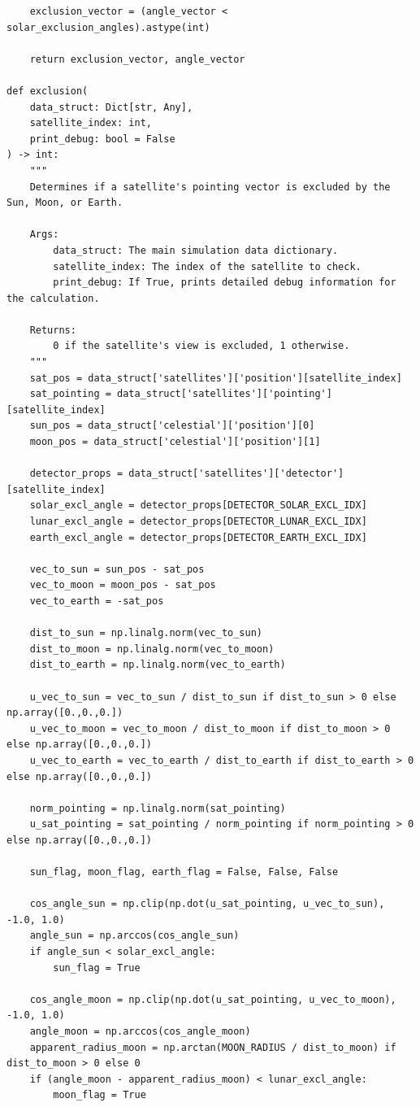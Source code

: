 \documentclass[11pt]{article}
\begin{document}
\begin{Verbatim}
    exclusion_vector = (angle_vector < solar_exclusion_angles).astype(int)

    return exclusion_vector, angle_vector

def exclusion(
    data_struct: Dict[str, Any],
    satellite_index: int,
    print_debug: bool = False
) -> int:
    """
    Determines if a satellite's pointing vector is excluded by the Sun, Moon, or Earth.

    Args:
        data_struct: The main simulation data dictionary.
        satellite_index: The index of the satellite to check.
        print_debug: If True, prints detailed debug information for the calculation.

    Returns:
        0 if the satellite's view is excluded, 1 otherwise.
    """
    sat_pos = data_struct['satellites']['position'][satellite_index]
    sat_pointing = data_struct['satellites']['pointing'][satellite_index]
    sun_pos = data_struct['celestial']['position'][0]
    moon_pos = data_struct['celestial']['position'][1]

    detector_props = data_struct['satellites']['detector'][satellite_index]
    solar_excl_angle = detector_props[DETECTOR_SOLAR_EXCL_IDX]
    lunar_excl_angle = detector_props[DETECTOR_LUNAR_EXCL_IDX]
    earth_excl_angle = detector_props[DETECTOR_EARTH_EXCL_IDX]

    vec_to_sun = sun_pos - sat_pos
    vec_to_moon = moon_pos - sat_pos
    vec_to_earth = -sat_pos

    dist_to_sun = np.linalg.norm(vec_to_sun)
    dist_to_moon = np.linalg.norm(vec_to_moon)
    dist_to_earth = np.linalg.norm(vec_to_earth)

    u_vec_to_sun = vec_to_sun / dist_to_sun if dist_to_sun > 0 else np.array([0.,0.,0.])
    u_vec_to_moon = vec_to_moon / dist_to_moon if dist_to_moon > 0 else np.array([0.,0.,0.])
    u_vec_to_earth = vec_to_earth / dist_to_earth if dist_to_earth > 0 else np.array([0.,0.,0.])

    norm_pointing = np.linalg.norm(sat_pointing)
    u_sat_pointing = sat_pointing / norm_pointing if norm_pointing > 0 else np.array([0.,0.,0.])

    sun_flag, moon_flag, earth_flag = False, False, False

    cos_angle_sun = np.clip(np.dot(u_sat_pointing, u_vec_to_sun), -1.0, 1.0)
    angle_sun = np.arccos(cos_angle_sun)
    if angle_sun < solar_excl_angle:
        sun_flag = True

    cos_angle_moon = np.clip(np.dot(u_sat_pointing, u_vec_to_moon), -1.0, 1.0)
    angle_moon = np.arccos(cos_angle_moon)
    apparent_radius_moon = np.arctan(MOON_RADIUS / dist_to_moon) if dist_to_moon > 0 else 0
    if (angle_moon - apparent_radius_moon) < lunar_excl_angle:
        moon_flag = True


\end{Verbatim}
\end{document}
